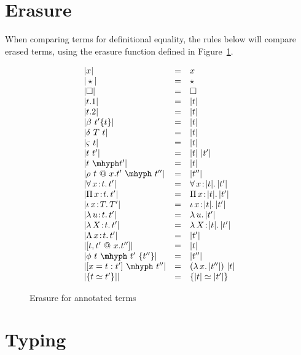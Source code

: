\documentclass{article}
\newcommand{\abs}[4]{{#1}\, #2\! : \! #3.\, #4}
\newcommand{\absu}[3]{{#1}\, #2.\, #3}
\begin{document}
\section{Erasure}

When comparing terms for definitional equality, the rules below will
compare erased terms, using the erasure function defined in
Figure~\ref{fig:eraser}.

\begin{figure}
  \[
  \begin{array}{lll}
    |x| & = & x \\
    |\star| & = & \star \\
    |\Box| & = & \Box \\
    |t.1| & = & |t| \\
    |t.2| & = & |t| \\
    |\beta\ t'\{t\}| & = & |t|\\
    |\delta\ T\ t| & = & |t|\\
    |\varsigma\ t| & = & |t| \\
    |t\ t'| & = & |t|\ |t'| \\
    |t\ \mhyph t'| & = & |t| \\
    |\rho\ t\ @\ x.t'\ \mhyph\ t''| & = & |t''| \\
    |\abs{\forall}{x}{t}{t'}| & = & \abs{\forall}{x}{|t|}{|t'|}\\
    |\abs{\Pi}{x}{t}{t'}| & = & \abs{\Pi}{x}{|t|}{|t'|}\\
    |\abs{\iota}{x}{T}{T'}| & = & \abs{\iota}{x}{|t|}{|t'|} \\
    |\abs{\lambda}{u}{t}{t'}| & = &  \absu{\lambda}{u}{|t'|} \\
    |\abs{\lambda}{X}{t}{t'}| & = &  \abs{\lambda}{X}{|t|}{|t'|} \\
    |\abs{\Lambda}{x}{t}{t'}| & = &  |t'| \\ 
    |[ t , t' \ @\ x.t'' ]| & = & |t| \\ 
    |\phi\ t\ \mhyph\ t'\ \{t''\}| & = & |t''| \\
    |[ x = t : t' ]\ \mhyph\ t'' | & = & (\absu{\lambda}{x}{|t''|})\ |t|\\
    |\{ t \simeq t' \}|| & = & \{ |t| \simeq |t'| \}
  \end{array}
  \]
  \caption{Erasure for annotated terms}
  \label{fig:eraser}
\end{figure}  


\section{Typing}
\end{document}
